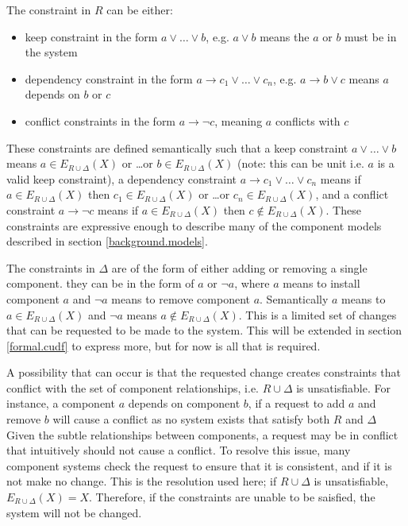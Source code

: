 The constraint in $R$ can be either: 
\begin{itemize}
  \item keep constraint in the form $a \vee \ldots \vee b$, e.g. $a \vee b$ means the $a$ or $b$ must be in the system
  \item dependency constraint in the form $a \rightarrow c_1 \vee \ldots \vee c_n$, e.g. $a \rightarrow b \vee c$ means $a$ depends on $b$ or $c$
  \item conflict constraints in the form $a \rightarrow \neg c$, meaning $a$ conflicts with $c$
\end{itemize}
These constraints are defined semantically such that
a keep constraint  $a \vee \ldots \vee b$ means $a \in E_{R \cup \Delta}(X)$ or \ldots or $b \in E_{R \cup \Delta}(X)$ (note: this can be unit i.e. $a$ is a valid keep constraint),
a dependency constraint $a \rightarrow c_1 \vee \ldots \vee c_n$ means if $a \in E_{R \cup \Delta}(X)$ then $c_1 \in E_{R \cup \Delta}(X)$ or \ldots or $c_n \in E_{R \cup \Delta}(X)$,
and a conflict constraint $a \rightarrow \neg c$ means if $a \in E_{R \cup \Delta}(X)$ then $c \not \in E_{R \cup \Delta}(X)$.
These constraints are expressive enough to describe many of the component models described in section \ref{background.models}.

The constraints in $\Delta$ are of the form of either adding or removing a single component.
they can be in the form of $a$ or $\neg a$, where $a$ means to install component $a$ and $\neg a$ means to remove component $a$.
Semantically $a$ means to $a \in E_{R \cup \Delta}(X)$ and $\neg a$ means $a \not \in E_{R \cup \Delta}(X)$. 
This is a limited set of changes that can be requested to be made to the system.
This will be extended in section \ref{formal.cudf} to express more, but for now is all that is required.

A possibility that can occur is that the requested change creates constraints that conflict with the set of component relationships,
i.e. $R \cup \Delta$ is unsatisfiable.
For instance, a component $a$ depends on component $b$, 
if a request to add $a$ and remove $b$ will cause a conflict as no system exists that satisfy both $R$ and $\Delta$  
Given the subtle relationships between components, a request may be in conflict that intuitively should not cause a conflict.
To resolve this issue, many component systems check the request to ensure that it is consistent, and if it is not make no change.
This is the resolution used here;
if $R \cup \Delta$ is unsatisfiable, $E_{R \cup \Delta}(X) = X$.
Therefore, if the constraints are unable to be saisfied, the system will not be changed.

